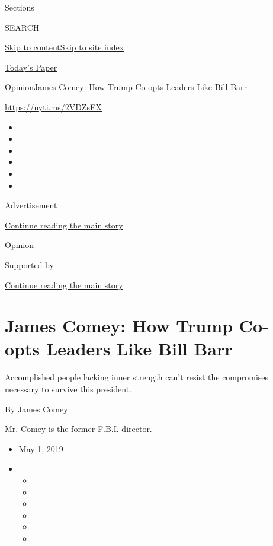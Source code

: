 Sections

SEARCH

\protect\hyperlink{site-content}{Skip to
content}\protect\hyperlink{site-index}{Skip to site index}

\href{https://myaccount.nytimes.com/auth/login?response_type=cookie\&client_id=vi}{}

\href{https://www.nytimes.com/section/todayspaper}{Today's Paper}

\href{/section/opinion}{Opinion}\textbar{}James Comey: How Trump Co-opts
Leaders Like Bill Barr

\url{https://nyti.ms/2VDZsEX}

\begin{itemize}
\item
\item
\item
\item
\item
\item
\end{itemize}

Advertisement

\protect\hyperlink{after-top}{Continue reading the main story}

\href{/section/opinion}{Opinion}

Supported by

\protect\hyperlink{after-sponsor}{Continue reading the main story}

\hypertarget{james-comey-how-trump-co-opts-leaders-like-bill-barr}{%
\section{James Comey: How Trump Co-opts Leaders Like Bill
Barr}\label{james-comey-how-trump-co-opts-leaders-like-bill-barr}}

Accomplished people lacking inner strength can't resist the compromises
necessary to survive this president.

By James Comey

Mr. Comey is the former F.B.I. director.

\begin{itemize}
\item
  May 1, 2019
\item
  \begin{itemize}
  \item
  \item
  \item
  \item
  \item
  \item
  \end{itemize}
\end{itemize}

